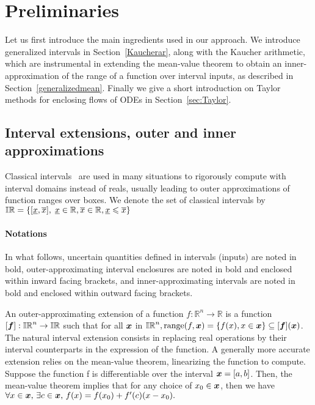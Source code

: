 \documentclass{sig-alternate-05-2015}
\def\R{{\mathbb R}}
\def\bbr{{\Bbb R}}
\def\I{{\Bbb I \Bbb R}}
\begin{document}
\section{Preliminaries}
\label{prelim}

Let us first introduce the main ingredients used in our approach. We introduce
generalized intervals in Section~\ref{Kaucherar}, along with the Kaucher arithmetic, which are instrumental in extending 
the mean-value theorem to obtain an inner-approximation of the range of a function over interval inputs, 
as described in Section~\ref{generalizedmean}. Finally we give a short introduction on Taylor methods for enclosing flows of ODEs in Section~\ref{sec:Taylor}. 

\subsection{Interval extensions, outer and inner approximations}
Classical intervals~\cite{Moore66,IA2001} are used in many situations to rigorously compute with interval
domains instead of reals, usually leading to outer approximations of function
ranges over boxes. 
We denote the set of classical intervals by $\I = \{ [\underline{x},\overline{x}], \; \underline{x} \in \bbr, \overline{x} \in \bbr,  \underline{x} \leqslant \overline{x} \}$
\paragraph{Notations}
In what follows, 
uncertain quantities defined in intervals (inputs) are noted in bold, outer-approximating interval enclosures are noted in bold and enclosed within inward facing brackets, 
and inner-approximating intervals are noted in bold and enclosed within outward facing 
brackets.

 An outer-approximating extension of a function $f: \R^n \rightarrow \R $ is a function 
$[\f]: \I^n\rightarrow \I$ such that for all $\x$ in $\I^n, \mbox{range}(f,\x)=\{f(x), x \in \x\} \subseteq [\f](\x)$.
The natural interval extension consists in replacing real
operations by their interval counterparts in the expression of the function. 
A generally more accurate extension relies on the mean-value theorem, linearizing the 
function to compute. Suppose the function f is differentiable over the interval 
$\x = [a, b]$. Then, the mean-value theorem implies that for any choice of $x_0 \in \x$, then we have
$ \forall x \in \x, \, \exists c \in \x, \, f(x) = f(x_0) + f'(c) (x-x_0).$
\end{document}
